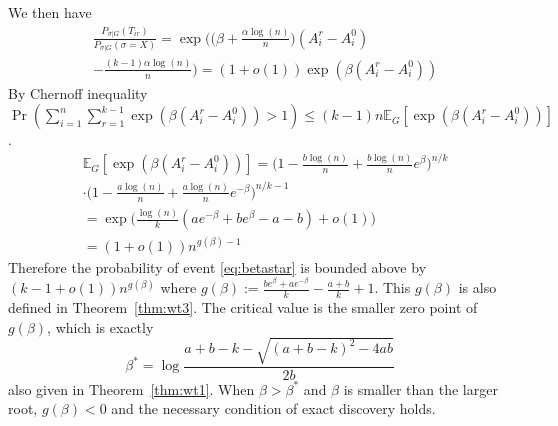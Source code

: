 \documentclass[conference]{IEEEtran}
\begin{document}
We then have
\begin{align}
&\frac{P_{\sigma|G}(T_{ir})}
{P_{\sigma|G}(\sigma=X)}
= \exp\Big(\big(\beta+\frac{\alpha\log(n)}{n} \big) (A^r_i-A^0_i) \nonumber\\
&-\frac{(k-1)\alpha\log(n)}{n} \Big) 
= (1+o(1)) \exp ( \beta(A^r_i-A^0_i))
\end{align}
By Chernoff inequality $ \Pr(\sum_{i=1}^n\sum_{r=1}^{k-1}\exp ( \beta(A^r_i-A^0_i)) > 1) \leq (k-1)n\mathbb{E}_G[\exp (\beta (A^r_i-A^0_i))] $.
\begin{align}
&\mathbb{E}_G[\exp (\beta (A^r_i-A^0_i))]
=\Big(1-\frac{b\log(n)}{n}+\frac{b\log(n)}{n} e^{\beta} \Big)^{n/k} \nonumber \\
&\cdot \Big(1-\frac{a\log(n)}{n}+\frac{a\log(n)}{n} e^{-\beta} \Big)^{n/k-1}\nonumber\\
& = 
\exp\Big(\frac{\log(n)}{k} ( a e^{-\beta}+b e^{\beta} -a-b )
+o(1) \Big)\nonumber \\
& = (1+o(1)) n^{g(\beta)-1} \label{eq:gbetaminus1}
\end{align}
Therefore the probability of event \eqref{eq:betastar} is bounded above by $ (k-1 + o(1)) n^{g(\beta)}$
where $g(\beta)  := \frac{b e^{\beta}+a e^{-\beta}}{k}-\frac{a+b}{k}+1$. This $g(\beta)$ is also defined in Theorem~\ref{thm:wt3}.
The critical value is the smaller zero point of $g(\beta)$, which is exactly
$$
\beta^* = \log\frac{a+b-k-\sqrt{(a+b-k)^2-4ab}}{2 b}
$$
also given in Theorem~\ref{thm:wt1}.
When $\beta > \beta^*$ and $\beta$ is smaller than the larger root, $g(\beta) < 0$ and the necessary condition of exact discovery holds.
\end{document}
